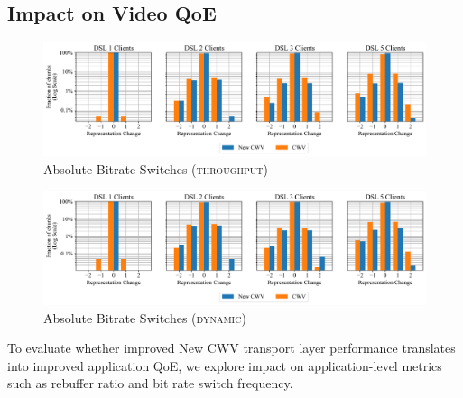 \documentclass[10pt, acmlarge]{acmart}
\begin{document}
\subsection{Impact on Video QoE}
\label{sec:QoE-impact}

\begin{figure}
  \centering
  \includegraphics[width=\textwidth, keepaspectratio]{figures/bitrate_derivative_distribution_throughput.pdf}
  \caption{Absolute Bitrate Switches (\textsc{throughput})}
  \label{fig:bitrate-switches}
\end{figure}

\begin{figure}
  \centering
  \includegraphics[width=\textwidth, keepaspectratio]{figures/bitrate_derivative_distribution_dynamic.pdf}
  \caption{Absolute Bitrate Switches (\textsc{dynamic})}
  \label{fig:bitrate-switches-dynamic}
\end{figure}


To evaluate whether improved New CWV transport layer performance translates into 
improved application QoE, we explore impact on application-level metrics such as 
rebuffer ratio and bit rate switch frequency. 
\end{document}

